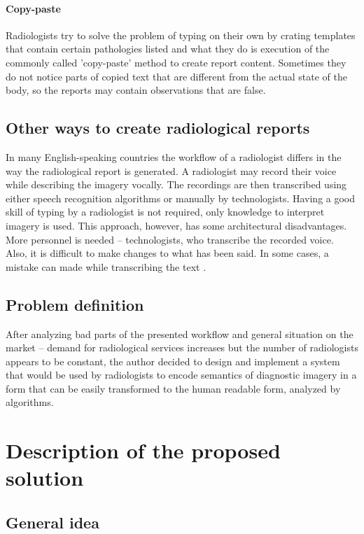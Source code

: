 \documentclass[12pt, twoside, openany]{report}
\theoremstyle{definition}
\begin{document}
\subsubsection{Copy-paste}
Radiologists try to solve the problem of typing on their own by crating templates that contain certain pathologies listed and what they do is execution of the commonly called 'copy-paste' method to create report content. Sometimes they do not notice parts of copied text that are different from the actual state of the body, so the reports may contain observations that are false. 

\section{Other ways to create radiological reports}
In many English-speaking countries the workflow of a radiologist differs in the way the radiological report is generated. A radiologist may record their voice while describing the imagery vocally. The recordings are then transcribed using either speech recognition algorithms or manually by technologists. Having a good skill of typing by a radiologist is not required, only knowledge to interpret imagery is used. This approach, however, has some architectural disadvantages. More personnel is needed -- technologists, who transcribe the recorded voice\cite{speech-impact}. Also, it is difficult to make changes to what has been said. In some cases, a mistake can made while transcribing the text \cite{speech-africa}.

\section{Problem definition}

After analyzing bad parts of the presented workflow and general situation on the market -- demand for radiological services increases but the number of radiologists appears to be constant, the author decided to design and implement a system that would be used by radiologists to encode semantics of diagnostic imagery in a form that can be easily transformed to the human readable form, analyzed by algorithms. 

\chapter{Description of the proposed solution}
\section{General idea}
\end{document}

